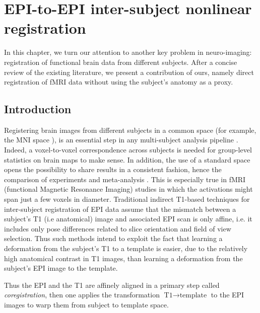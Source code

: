 \chapter{EPI-to-EPI inter-subject nonlinear registration}\label{chap:epi2epi}

\minitoc

In this chapter, we turn our attention to another key problem in neuro-imaging: registration of functional brain data from different subjects. After a concise review of the existing literature,
we present a contribution of ours, namely direct registration of fMRI data without using the subject's anatomy as a proxy.

\section{Introduction}
Registering brain images from different subjects in a common space
(for example, the MNI space \citep{pmid8126267,pmid9343592}), is an
essential step in any multi-subject analysis pipeline \citep{FristonBook}. Indeed, a
voxel-to-voxel correspondence across subjects is needed for
group-level statistics on brain maps to make sense.
In addition, the use of a standard space opens the possibility to share
results in a consistent fashion, hence the comparison of experiments
and meta-analysis \citep{pmid18985131,pmid25914639}.
This is especially true in fMRI (functional Magnetic Resonance Imaging)
studies in which the activations might span just a few voxels in diameter.
Traditional indirect T1-based techniques for inter-subject
registration of EPI data assume that the mismatch between a subject's
T1 (i.e anatomical) image and associated EPI scan is only affine,
i.e. it includes only pose differences related to slice orientation
and field of view selection. Thus such methods intend to exploit the
fact that learning a deformation from the subject's T1 to a template
is easier, due to the relatively high anatomical contrast in T1
images, than learning a deformation from the subject's EPI image to the
template.

Thus the EPI and the T1 are affinely aligned in a primary step called
\textit{coregistration}, then one applies the transformation $\text{T1}
\rightarrow \text{template}$ to the EPI images to warp them from subject to
template space. %

